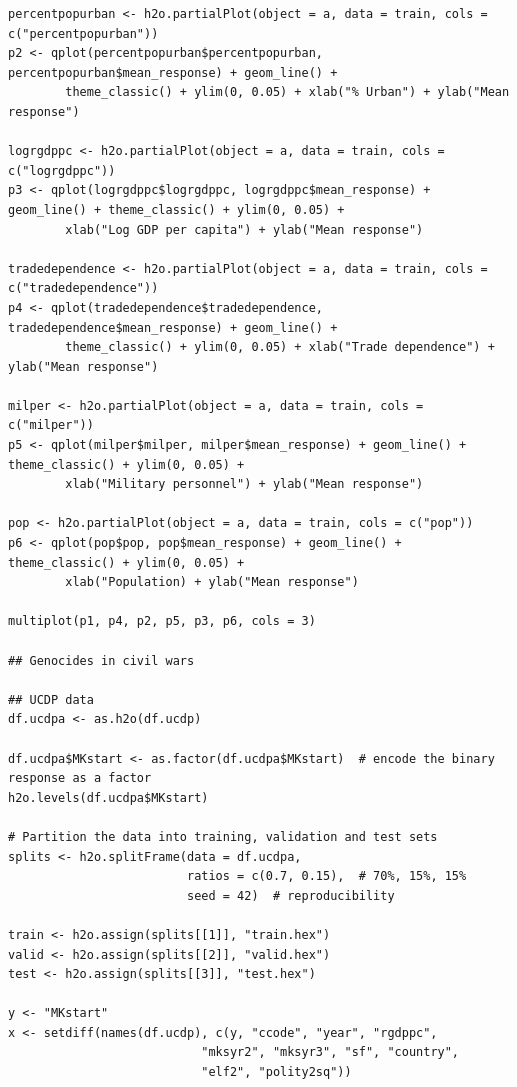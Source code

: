 \documentclass[a4paper,12pt]{article}
\begin{document}
\begin{verbatim}
percentpopurban <- h2o.partialPlot(object = a, data = train, cols = c("percentpopurban"))
p2 <- qplot(percentpopurban$percentpopurban, percentpopurban$mean_response) + geom_line() +
        theme_classic() + ylim(0, 0.05) + xlab("% Urban") + ylab("Mean response")

logrgdppc <- h2o.partialPlot(object = a, data = train, cols = c("logrgdppc"))
p3 <- qplot(logrgdppc$logrgdppc, logrgdppc$mean_response) + geom_line() + theme_classic() + ylim(0, 0.05) +
        xlab("Log GDP per capita") + ylab("Mean response")

tradedependence <- h2o.partialPlot(object = a, data = train, cols = c("tradedependence"))
p4 <- qplot(tradedependence$tradedependence, tradedependence$mean_response) + geom_line() +
        theme_classic() + ylim(0, 0.05) + xlab("Trade dependence") + ylab("Mean response")

milper <- h2o.partialPlot(object = a, data = train, cols = c("milper"))
p5 <- qplot(milper$milper, milper$mean_response) + geom_line() + theme_classic() + ylim(0, 0.05) +
        xlab("Military personnel") + ylab("Mean response")

pop <- h2o.partialPlot(object = a, data = train, cols = c("pop"))
p6 <- qplot(pop$pop, pop$mean_response) + geom_line() + theme_classic() + ylim(0, 0.05) +
        xlab("Population) + ylab("Mean response")

multiplot(p1, p4, p2, p5, p3, p6, cols = 3)

## Genocides in civil wars

## UCDP data
df.ucdpa <- as.h2o(df.ucdp)

df.ucdpa$MKstart <- as.factor(df.ucdpa$MKstart)  # encode the binary response as a factor
h2o.levels(df.ucdpa$MKstart)

# Partition the data into training, validation and test sets
splits <- h2o.splitFrame(data = df.ucdpa, 
                         ratios = c(0.7, 0.15),  # 70%, 15%, 15%
                         seed = 42)  # reproducibility

train <- h2o.assign(splits[[1]], "train.hex")   
valid <- h2o.assign(splits[[2]], "valid.hex") 
test <- h2o.assign(splits[[3]], "test.hex")

y <- "MKstart"
x <- setdiff(names(df.ucdp), c(y, "ccode", "year", "rgdppc",
                           "mksyr2", "mksyr3", "sf", "country",
                           "elf2", "polity2sq")) 


\end{verbatim}
\end{document}
